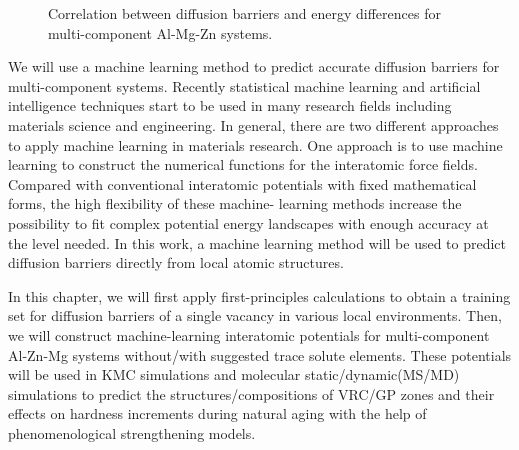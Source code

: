 \begingroup
\begin{figure}[!ht]
  \centering
\caption[Correlation between diffusion barriers and energy differences for multi-component Al-Mg-Zn systems]{Correlation between diffusion barriers and energy differences for multi-component Al-Mg-Zn systems.}
  \label{Chap:Al/Vac:fig2}
\end{figure}
\endgroup


We will use a machine learning method to predict accurate diffusion barriers for multi-component systems. Recently statistical machine learning and artificial intelligence techniques start to be used in many research fields including materials science and engineering. In general, there are two different approaches to apply machine learning in materials research. One approach is to use machine learning to construct the numerical functions for the interatomic force fields. \cite{bartok2010gaussian,behler2011atom,szlachta2014accuracy,artrith2016implementation,mehta2014exact,artrith2017efficient} Compared with conventional interatomic potentials with fixed mathematical forms, the high flexibility of these machine- learning methods increase the possibility to fit complex potential energy landscapes with enough accuracy at the level needed. In this work, a machine learning method will be used to predict diffusion barriers directly from local atomic structures.


In this chapter, we will first apply first-principles calculations to obtain a training set for diffusion barriers of a single vacancy in various local environments. Then, we will construct machine-learning interatomic potentials for multi-component Al-Zn-Mg systems without/with suggested trace solute elements. These potentials will be used in \ac{KMC} simulations and molecular static/dynamic(MS/MD) simulations to predict the structures/compositions of \ac{VRC}/\ac{GP} zones and their effects on hardness increments during natural aging with the help of phenomenological strengthening models.